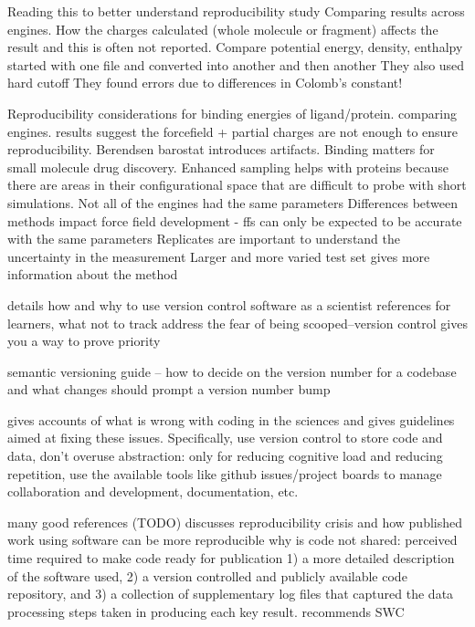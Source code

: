 \cite{Shirts2017}
Reading this to better understand reproducibility study
Comparing results across engines. 
How the charges calculated (whole molecule or fragment) affects the result and this is often not reported.
Compare potential energy, density, enthalpy
started with one file and converted into another and then another
They also used hard cutoff
They found errors due to differences in Colomb's constant!

\cite{Rizzi2020}
Reproducibility considerations for binding energies of ligand/protein. 
comparing engines. 
results suggest the forcefield + partial charges are not enough to ensure reproducibility. 
Berendsen barostat introduces artifacts.
Binding matters for small molecule drug discovery.
Enhanced sampling helps with proteins because there are areas in their configurational space that are difficult to probe with short simulations.
Not all of the engines had the same parameters
Differences between methods impact force field development
- ffs can only be expected to be accurate with the same parameters
Replicates are important to understand the uncertainty in the measurement
Larger and more varied test set gives more information about the method

\cite{Blischak2016}
details how and why to use version control software as a scientist
references for learners, what not to track
address the fear of being scooped--version control gives you a way to prove priority

\cite{Preston-Werner}
semantic versioning guide -- how to decide on the version number for a codebase and what changes should prompt a version number bump

\cite{Gentzkow2014}
gives accounts of what is wrong with coding in the sciences and gives guidelines aimed at fixing these issues. 
Specifically, use version control to store code and data, 
don't overuse abstraction: only for reducing cognitive load and reducing repetition, 
use the available tools like github issues/project boards to manage collaboration and development, documentation, etc.

\cite{Irving2016}
many good references (TODO) 
discusses reproducibility crisis and how published work using software can be more reproducible
why is code not shared: perceived time required to make code ready for publication
1) a more detailed description of the software used, 2) a version controlled and publicly available code repository, and 3) a collection of supplementary log files that captured the data processing steps taken in producing each key result.
recommends SWC

